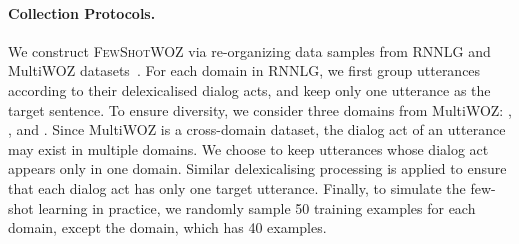 \documentclass[11pt,a4paper]{article}
\newcommand{\data}{\textsc{FewShotWOZ}}
\begin{document}
\begin{table*}[htbp]
    \centering
    \footnotesize
    \caption{\data{} statistics over 7 different domains. }
    \label{tab:fewshotwoz}
    \vspace{-2mm}
\end{table*}

\paragraph{Collection Protocols.} We construct \data{} via re-organizing data samples from RNNLG and MultiWOZ datasets~\citep{budzianowski2018multiwoz}. For each domain in RNNLG, we first group utterances according to their delexicalised dialog acts, and keep only one utterance as the target sentence. 
To ensure diversity, we consider three domains from MultiWOZ: , , and . 
Since MultiWOZ is a cross-domain dataset, the dialog act of an utterance may exist in multiple domains. 
We choose to keep utterances whose dialog act appears only in one domain. 
Similar delexicalising processing is applied to ensure that each dialog act has only one target utterance. 
Finally, to simulate the few-shot learning in practice, we randomly sample 50 training examples for each domain, except the  domain, which has 40 examples. 
\end{document}
